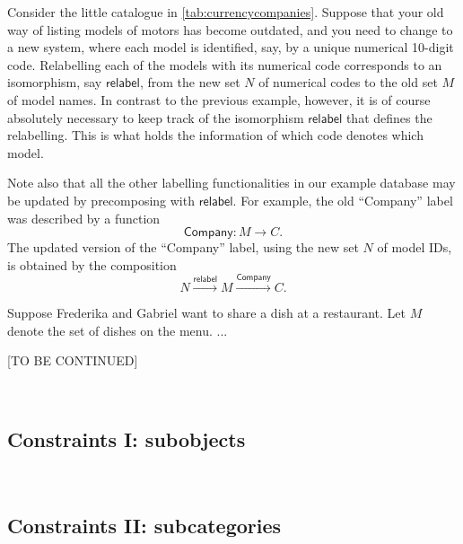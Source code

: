 \begin{example}[Relabelling]
Consider the little catalogue in \cref{tab:currencycompanies}. Suppose that your old way of listing models of motors has become outdated, and you need to change to a new system, where each model is identified, say, by a unique numerical 10-digit code. Relabelling each of the models with its numerical code corresponds to an isomorphism, say $\mathsf{relabel}$, from the new set $N$ of numerical codes to the old set $M$ of model names. In contrast to the previous example, however, it is of course absolutely necessary to keep track of the isomorphism $\mathsf{relabel}$ that defines the relabelling. This is what holds the information of which code denotes which model. 

Note also that all the other labelling functionalities in our example database may be updated by precomposing with $\mathsf{relabel}$. For example, the old ``Company'' label was described by a function 
\begin{equation*}
\mathsf{Company}\colon M \longrightarrow C.
\end{equation*}
The updated version of the ``Company'' label, using the new set $N$ of model IDs, is obtained by the composition
\begin{equation*}
N \overset{\mathsf{relabel}}{\longrightarrow} M \overset{\mathsf{Company}}{\longrightarrow} C.
\end{equation*}
\end{example}




\begin{example}
Suppose Frederika and Gabriel want to share a dish at a restaurant. Let $M$ denote the set of dishes on the menu. ...

\end{example}

[TO BE CONTINUED]

\


\subsection{Constraints I: subobjects}

\


\subsection{Constraints II: subcategories}




